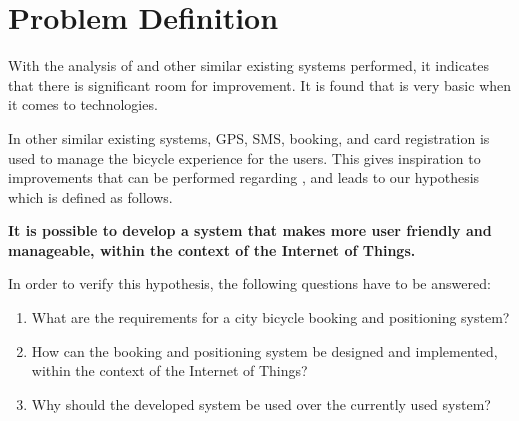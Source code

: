 \section{Problem Definition}\label{sec:probdef}
With the analysis of \bycykel and other similar existing systems performed, it indicates that there is significant room for improvement.
It is found that \bycykel is very basic when it comes to technologies.

In other similar existing systems, GPS, SMS, booking, and card registration is used to manage the bicycle experience for the users.
This gives inspiration to improvements that can be performed regarding \bycykelwithoutspace, and leads to our hypothesis which is defined as follows.

\begin{center}
\textbf{It is possible to develop a system that makes \bycykel more user friendly and manageable, within the context of the Internet of Things.}
\end{center}

In order to verify this hypothesis, the following questions have to be answered:

\begin{enumerate}
	\item What are the requirements for a city bicycle booking and positioning system?
	\item How can the booking and positioning system be designed and implemented, within the context of the Internet of Things?
	\item Why should the developed system be used over the currently used system?
\end{enumerate}